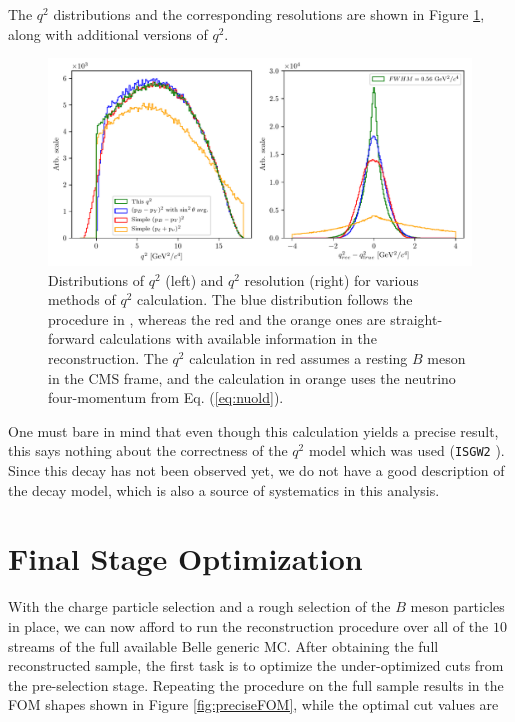 The $q^2$ distributions and the corresponding resolutions are shown in Figure \ref{fig:q2}, along with additional versions of $q^2$.
\begin{figure}[H]
\centering
\captionsetup{width=0.8\linewidth}
\includegraphics[width=\linewidth]{fig/q2}
\caption{Distributions of $q^2$ (left) and $q^2$ resolution (right) for various methods of $q^2$ calculation. The blue distribution follows the procedure in \cite{VubCLEO}, whereas the red and the orange ones are straight-forward calculations with available information in the reconstruction. The $q^2$ calculation in red assumes a resting $B$ meson in the CMS frame, and the calculation in orange uses the neutrino four-momentum from Eq. (\ref{eq:nuold}).}
\label{fig:q2}
\end{figure}

One must bare in mind that even though this calculation yields a precise result, this says nothing about the correctness of the $q^2$ model which was used (\texttt{ISGW2} \cite{Scora:1995ty}). Since this decay has not been observed yet, we do not have a good description of the decay model, which is also a source of systematics in this analysis.

\section{Final Stage Optimization}

With the charge particle selection and a rough selection of the $B$ meson particles in place, we can now afford to run the reconstruction procedure over all of the $10$ streams of the full available Belle generic MC. After obtaining the full reconstructed sample, the first task is to optimize the under-optimized cuts from the pre-selection stage. Repeating the procedure on the full sample results in the FOM shapes shown in Figure \ref{fig:preciseFOM}, while the optimal cut values are

